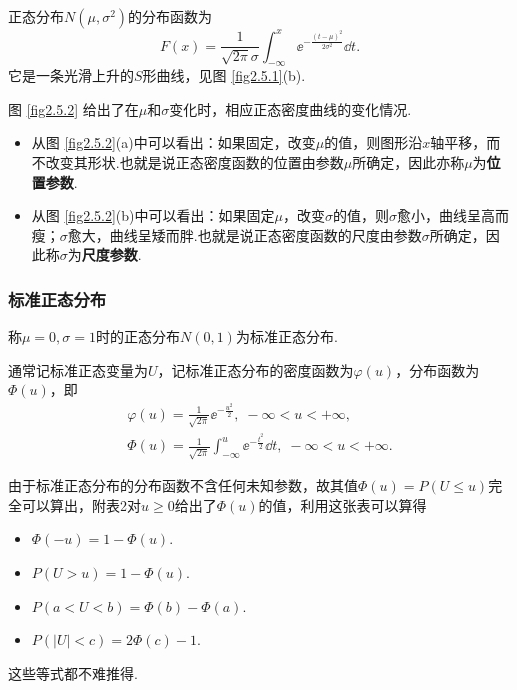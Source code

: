 正态分布$N(\mu,\sigma^2)$的分布函数为
\begin{equation}\label{eq2.5.2}
  F(x) = \frac1{\sqrt{2\pi}\sigma}\int_{-\infty}^x \ee^{-\frac{(t-\mu)^2}{2\sigma^2}} \dd t.
\end{equation}
它是一条光滑上升的$S$形曲线，见图 \ref{fig2.5.1}(b).

图 \ref{fig2.5.2} 给出了在$\mu$和$\sigma$变化时，相应正态密度曲线的变化情况.

\begin{itemize}
  \item 从图 \ref{fig2.5.2}(a)中可以看出：如果固定，改变$\mu$的值，则图形沿$x$轴平移，而不改变其形状.也就是说正态密度函数的位置由参数$\mu$所确定，因此亦称$\mu$为\textbf{位置参数}.

  \item 从图 \ref{fig2.5.2}(b)中可以看出：如果固定$\mu$，改变$\sigma$的值，则$\sigma$愈小，曲线呈高而瘦；$\sigma$愈大，曲线呈矮而胖.也就是说正态密度函数的尺度由参数$\sigma$所确定，因此称$\sigma$为\textbf{尺度参数}.
\end{itemize}

\subsubsection{标准正态分布}
称$\mu=0,\sigma=1$时的正态分布$N(0,1)$为标准正态分布.

通常记标准正态变量为$U$，记标准正态分布的密度函数为$\varphi(u)$，分布函数为$\varPhi(u)$，即
\begin{gather*}
  \varphi(u) = \frac1{\sqrt{2\pi}} \ee^{-\frac{u^2}2},\; -\infty < u < +\infty, \\
  \varPhi(u) = \frac1{\sqrt{2\pi}} \int_{-\infty}^u \ee^{-\frac{t^2}2}\dd t,\; -\infty < u < +\infty.
\end{gather*}

由于标准正态分布的分布函数不含任何未知参数，故其值$\varPhi(u)=P(U\le u)$完全可以算出，附表2对$u\ge0$给出了$\varPhi(u)$的值，利用这张表可以算得

\begin{itemize}
  \item $\varPhi(-u)=1-\varPhi(u)$.
  \item $P(U>u)=1-\varPhi(u)$.
  \item $P(a<U<b)=\varPhi(b)-\varPhi(a)$.
  \item $P(|U|<c)=2\varPhi(c)-1$.
\end{itemize}
这些等式都不难推得.

